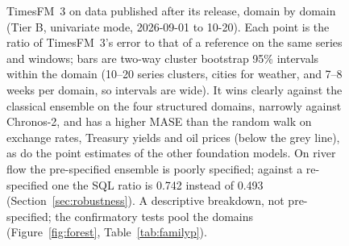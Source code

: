 \begin{figure}[!t]
\caption{TimesFM~3 on data published after its release, domain by domain (Tier B, univariate mode, 2026-09-01 to 10-20). Each
point is the ratio of TimesFM~3's error to that of a reference on the same series and windows; bars are two-way cluster
bootstrap 95\% intervals within the domain (10--20 series clusters, cities for weather, and 7--8 weeks per domain, so intervals are wide). It wins clearly
against the classical ensemble on the four structured domains, narrowly against Chronos-2, and has a higher MASE than the random
walk on exchange rates, Treasury yields and oil prices (below the grey line), as do the point estimates of the other foundation models. On river flow the
pre-specified ensemble is poorly specified; against a re-specified one the SQL ratio is 0.742 instead of 0.493
(Section~\ref{sec:robustness}). A descriptive breakdown, not
pre-specified; the confirmatory tests pool the domains (Figure~\ref{fig:forest}, Table~\ref{tab:familyp}).}
\label{fig:domains}
\end{figure}
